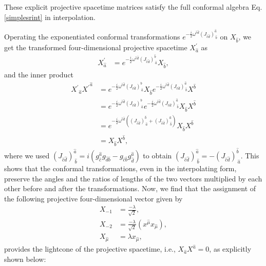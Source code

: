 \documentclass[%
 reprint,
superscriptaddress,
 amsmath,amssymb,
 aps,
]{revtex4-2}
\begin{document}
These explicit projective spacetime matrices satisfy the full conformal algebra Eq.\eqref{simplesrint} in interpolation. 

Operating the exponentiated conformal transformations $e^{-\frac{i}{2}\omega^{\hat{c}\hat{d}}(J_{\hat{c}\hat{d}})^{\hat{a}}_{~\hat{b}}}$ on $X_{\hat{b}}$, we get the transformed four-dimensional projective spacetime $X^{\prime}_{\hat{a}}$ as 
\begin{align}
\label{exponential-conformal-tranf}
  X^{\prime}_{\hat{a}}&=e^{-\frac{i}{2}\omega^{\hat{c}\hat{d}}(J_{\hat{c}\hat{d}})^{\hat{b}}_{~\hat{a}}}X_{\hat{b}},
\end{align}
and the inner product
\begin{align}
{X^{\prime}}_{\hat{a}}{X^{\prime}}^{\hat{a}} &= 
e^{-\frac{i}{2}\omega^{\hat{c}\hat{d}}(J_{\hat{c}\hat{d}})^{\hat{b}}_{~\hat{a}}}X_{\hat{b}}e^{-\frac{i}{2}\omega^{\hat{c}\hat{d}}(J_{\hat{c}\hat{d}})^{\hat{a}}_{~\hat{b}}}X^{\hat{b}}\nonumber\\
&= e^{-\frac{i}{2}\omega^{\hat{c}\hat{d}}(J_{\hat{c}\hat{d}})^{\hat{b}}_{~\hat{a}}}e^{-\frac{i}{2}\omega^{\hat{c}\hat{d}}(J_{\hat{c}\hat{d}})^{\hat{a}}_{~\hat{b}}}X_{\hat{b}}X^{\hat{b}}\nonumber\\
&= e^{-\frac{i}{2}\omega^{\hat{c}\hat{d}}((J_{\hat{c}\hat{d}})^{\hat{b}}_{~\hat{a}}+(J_{\hat{c}\hat{d}})^{\hat{a}}_{~\hat{b}})}X_{\hat{b}}X^{\hat{b}}\nonumber\\
&= X_{\hat{b}}X^{\hat{b}},
\end{align}
where we used $(J_{{\hat{c}}{\hat{d}}})^{\hat{a}}_{~\hat{b}}=i(g_{\hat{c}}^{\hat{a}} g_{{\hat{d}}{\hat{b}}}-g_{{\hat{c}}{\hat{b}}} g_{\hat{d}}^{\hat{a}})$ to obtain $(J_{\hat{c}\hat{d}})^{\hat{a}}_{~\hat{b}}=-(J_{\hat{c}\hat{d}})^{\hat{b}}_{~\hat{a}}$.
This shows that the conformal transformations, even in the interpolating form, preserve the angles and the ratios of lengths of the two vectors multiplied by each other before and after the transformations. Now, we find that the assignment of the following projective four-dimensional vector given by 
\begin{align}
    {X}_{-1}&=\frac{-\lambda}{\sqrt{2}}, \nonumber\\
    {X}_{-2}&=\frac{-\lambda}{\sqrt{2}}(x^{\hat{\mu}}x_{\hat{\mu}}), \nonumber \\
     {X}_{\hat{\mu}}&=\lambda x_{\hat{\mu}},\label{X-mu}
\end{align}
provides the lightcone of the projective spacetime, i.e., ${X}_{\hat{a}}{X}^{\hat{a}}=0$, as explicitly shown below: 
\end{document}
